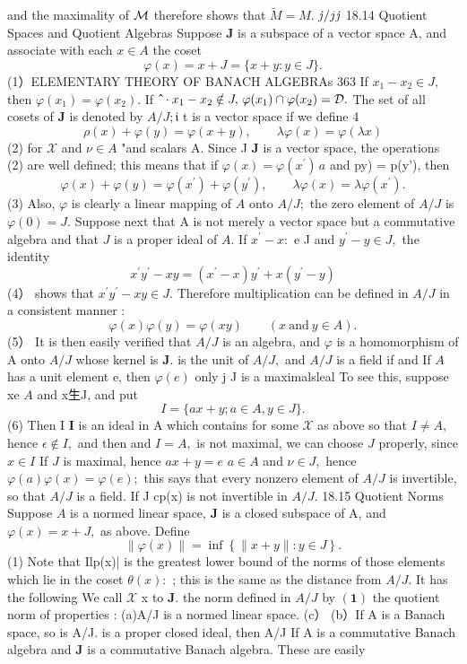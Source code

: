 and the maximality of ${\cal{M}}$ therefore shows that ${\widetilde{M}}=M.$ ${\it j}/j{\it j}$ 18.14 Quotient Spaces and Quotient Algebras Suppose $\boldsymbol{J}$ is a subspace of a vector space A, and associate with each $x\in A$ the coset $$ \varphi(x)=x+J=\{x+y\colon y\in J\}. $$ (1）ELEMENTARY THEORY OF BANACH ALGEBRAs 363 If $x_{1}-x_{2}\in J,$ then $\varphi(x_{1})=\varphi(x_{2}).$ If ${\bf\hat{\ }}\cdot x_{1}-x_{2}\notin J,\,\varphi(x_{1})\cap\varphi(x_{2})=\mathcal{D}.$ The set of all cosets of $\boldsymbol{J}$ is denoted by $A/J;{\mathfrak{i}}$ t is a vector space if we define 4 $$ \rho(x)+\varphi(y)=\varphi(x+y),\qquad\lambda\varphi(x)=\varphi(\lambda x) $$ (2) for $\scriptstyle{\mathcal{X}}$ and $\scriptstyle\nu\in A$ "and scalars A. Since J $\boldsymbol{J}$ is a vector space, the operations (2) are well defined; this means that if $\varphi(x)=\varphi(x^{\prime})\,a$ and py) = p(y'), then $$ \varphi(x)+\varphi(y)=\varphi(x^{\prime})+\varphi(y^{\prime}),\qquad\lambda\varphi(x)=\lambda\varphi(x^{\prime}). $$ (3) Also, $\varphi$ is clearly a linear mapping of $\scriptstyle A$ onto $A/J;$ the zero element of $A/J$ is $\varphi(0)=J.$ Suppose next that A is not merely a vector space but a commutative algebra and that ${\mathbf{}}J$ is a proper ideal of $A.$ If $x^{\prime}-x:$ e J and $y^{\prime}-y\in J,$ the identity $$ x^{\prime}y^{\prime}-x y=(x^{\prime}-x)y^{\prime}+x(y^{\prime}-y) $$ (4） shows that $x^{\prime}y^{\prime}-x y\in J.$ Therefore multiplication can be defined in $A/J$ in a consistent manner : $$ \varphi(x)\varphi(y)=\varphi(x y)\qquad(x{\mathrm{~and~}}y\in A). $$ (5） It is then easily verified that $A/J$ is an algebra, and $\varphi$ is a homomorphism of A onto $A/J$ whose kernel is ${\boldsymbol{J}}.$ is the unit of $A/J,$ and $A/J$ is a field if and If $\scriptstyle A$ has a unit element e, then $\varphi(e)$ only j J is a maximalsleal To see this, suppose xe $\scriptstyle A$ and x生J, and put $$ I=\{a x+y;a\in A,y\in J\}. $$ (6) Then I ${\mathbf I}$ is an ideal in A which contains for some $\scriptstyle{\mathcal{X}}$ as above so that $I\neq A,$ hence $\scriptstyle\epsilon\not\in I,$ and then and $I=A,$ is not maximal, we can choose ${\mathbf{}}J$ properly, since $x\in I$ If ${\mathbf{}}J$ is maximal, hence $a x+y=e$ $a\in A$ and $\nu\in J,$ hence $\varphi(a)\varphi(x)=\varphi(e);$ this says that every nonzero element of $A/J$ is invertible, so that $A/J$ is a field. If J cp(x) is not invertible in $A/J.$ 18.15 Quotient Norms Suppose $\scriptstyle A$ is a normed linear space, $\boldsymbol{J}$ is a closed subspace of A, and $\varphi(x)=x+J,$ as above. Define $$ \|\varphi(x)\|=\operatorname*{inf}\left\{\|x+y\|\colon y\in J\right\}. $$ (1) Note that Ilp(x)| is the greatest lower bound of the norms of those elements which lie in the coset $\scriptstyle{\theta(x){\mathrm{:}}}$ ; this is the same as the distance from $A/J.$ It has the following We call $\scriptstyle{\mathcal{X}}$ x to ${\boldsymbol{J}}.$ the norm defined in $A/J$ by $\mathbf{(1)}$ the quotient norm of properties : (a)A/J is a normed linear space. (c） (b）If A is a Banach space, so is A/J. is a proper closed ideal, then A/J If A is a commutative Banach algebra and $\boldsymbol{J}$ is a commutative Banach algebra. These are easily 